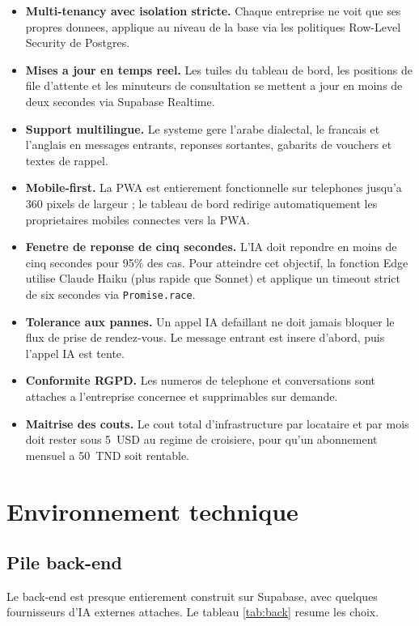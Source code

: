 \begin{itemize}
  \item \textbf{Multi-tenancy avec isolation stricte.} Chaque entreprise
        ne voit que ses propres donnees, applique au niveau de la base
        via les politiques Row-Level Security de Postgres.
  \item \textbf{Mises a jour en temps reel.} Les tuiles du tableau de
        bord, les positions de file d'attente et les minuteurs de
        consultation se mettent a jour en moins de deux secondes via
        Supabase Realtime.
  \item \textbf{Support multilingue.} Le systeme gere l'arabe dialectal,
        le francais et l'anglais en messages entrants, reponses
        sortantes, gabarits de vouchers et textes de rappel.
  \item \textbf{Mobile-first.} La PWA est entierement fonctionnelle sur
        telephones jusqu'a 360 pixels de largeur ; le tableau de bord
        redirige automatiquement les proprietaires mobiles connectes
        vers la PWA.
  \item \textbf{Fenetre de reponse de cinq secondes.} L'IA doit repondre
        en moins de cinq secondes pour 95\% des cas. Pour atteindre cet
        objectif, la fonction Edge utilise Claude Haiku (plus rapide
        que Sonnet) et applique un timeout strict de six secondes via
        \texttt{Promise.race}.
  \item \textbf{Tolerance aux pannes.} Un appel IA defaillant ne doit
        jamais bloquer le flux de prise de rendez-vous. Le message
        entrant est insere d'abord, puis l'appel IA est tente.
  \item \textbf{Conformite RGPD.} Les numeros de telephone et
        conversations sont attaches a l'entreprise concernee et
        supprimables sur demande.
  \item \textbf{Maitrise des couts.} Le cout total d'infrastructure par
        locataire et par mois doit rester sous 5~USD au regime de
        croisiere, pour qu'un abonnement mensuel a 50~TND soit rentable.
\end{itemize}

\section{Environnement technique}
\subsection{Pile back-end}
Le back-end est presque entierement construit sur Supabase, avec quelques
fournisseurs d'IA externes attaches. Le tableau \ref{tab:back} resume les
choix.

